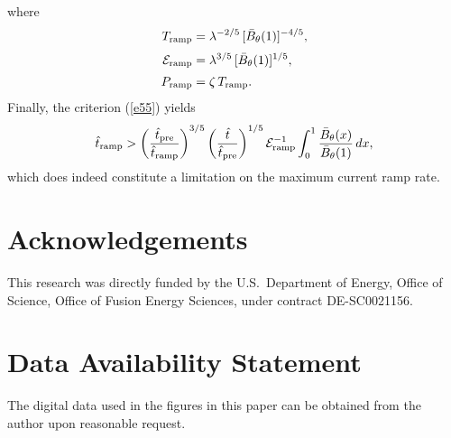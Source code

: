 \documentclass[12pt,prb,aps]{revtex4-1}
\begin{document}
where
\begin{align}
T_{\rm ramp}&= \lambda^{-2/5}\,[\bar{B}_\theta(1)]^{-4/5},\\[0.5ex]
{\cal E}_{\rm ramp} &= \lambda^{3/5}\,[\bar{B}_\theta(1)]^{1/5},\\[0.5ex]
P_{\rm ramp} &= \zeta\,T_{\rm ramp}.
\end{align}
Finally, the criterion (\ref{e55}) yields
\begin{equation}
\hat{t}_{\rm ramp} > \left(\frac{\hat{t}_{\rm pre}}{\hat{t}_{\rm ramp}}\right)^{3/5}\left(\frac{\hat{t}}{\hat{t}_{\rm pre}}\right)^{1/5}{\cal E}_{\rm ramp}^{-1}\int_0^1\frac{\bar{B}_{\theta}(x)}{\bar{B}_\theta(1)}\,dx,
\end{equation}
which does indeed constitute a limitation on the maximum current ramp rate.

\section*{Acknowledgements}
This research was directly funded by the U.S.\ Department of Energy, Office of Science, Office of Fusion Energy Sciences, under  contract DE-SC0021156. 

\section*{Data Availability Statement}
The digital data used in the figures in this paper can be obtained from the author upon reasonable request. 
\end{document}
